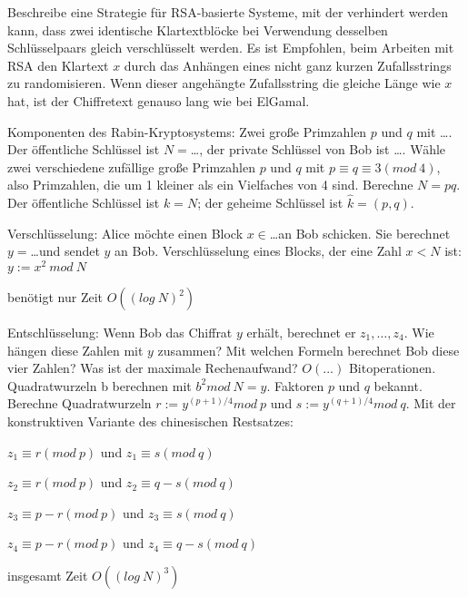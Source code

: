 \documentclass[avery5371, frame]{flashcards}
\begin{document}
\begin{flashcard}{Beschreibe eine Strategie für RSA-basierte Systeme, mit der verhindert werden kann, dass zwei identische Klartextblöcke bei Verwendung desselben Schlüsselpaars gleich verschlüsselt werden.}
    Es ist Empfohlen, beim Arbeiten mit RSA den Klartext $x$ durch das Anhängen eines nicht ganz kurzen Zufallsstrings zu randomisieren. Wenn dieser angehängte Zufallsstring die gleiche Länge wie $x$ hat, ist der Chiffretext genauso lang wie bei ElGamal.
\end{flashcard}

\begin{flashcard}{Komponenten des Rabin-Kryptosystems: Zwei große Primzahlen $p$ und $q$ mit \dots . Der öffentliche Schlüssel ist $N=$\dots, der private Schlüssel von Bob ist \dots .}
    Wähle zwei verschiedene zufällige große Primzahlen $p$ und $q$ mit $p\equiv q\equiv 3 (mod\ 4)$, also Primzahlen, die um 1 kleiner als ein Vielfaches von 4 sind. Berechne $N=pq$. Der öffentliche Schlüssel ist $k=N$; der geheime Schlüssel ist $\hat{k}= (p,q)$.
\end{flashcard}

\begin{flashcard}{Verschlüsselung: Alice möchte einen Block $x\in$\dots an Bob schicken. Sie berechnet $y=$\dots und sendet $y$ an Bob.}
    Verschlüsselung eines Blocks, der eine Zahl $x<N$ ist: $y:=x^2\ mod\ N$

    benötigt nur Zeit $O((log\ N)^2)$
\end{flashcard}

\begin{flashcard}{Entschlüsselung: Wenn Bob das Chiffrat $y$ erhält, berechnet er $z_1,\dots, z_4$. Wie hängen diese Zahlen mit $y$ zusammen?
        Mit welchen Formeln berechnet Bob diese vier Zahlen?
        Was ist der maximale Rechenaufwand? $O(...)$ Bitoperationen.}
    Quadratwurzeln b berechnen mit $b^2 mod\ N=y$.
    Faktoren $p$ und $q$ bekannt.
    Berechne Quadratwurzeln $r:=y^{(p+1)/4} mod\ p$ und $s:=y^{(q+1)/4} mod\ q$.
    Mit der konstruktiven Variante des chinesischen Restsatzes:
    \begin{itemize*}
        \item $z_1 \equiv r (mod\ p)$ und $z_1 \equiv s (mod\ q)$
        \item $z_2 \equiv r (mod\ p)$ und $z_2 \equiv q-s (mod\ q)$
        \item $z_3 \equiv p-r (mod\ p)$ und $z_3 \equiv s (mod\ q)$
        \item $z_4 \equiv p-r (mod\ p)$ und $z_4 \equiv q-s (mod\ q)$
    \end{itemize*}


    insgesamt Zeit $O((log\ N)^3)$
\end{flashcard}
\end{document}
